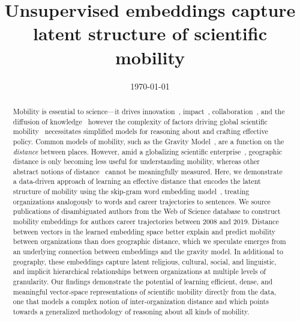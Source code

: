 \documentclass[12pt]{article} %
\begin{document}

\title{Unsupervised embeddings capture latent structure of scientific mobility} %
\date{\today}
\maketitle %

%
%

\begin{abstract}

Mobility is essential to science---it drives innovation~\autocite{braunerhjelm2020labor, kaiser2018innovation, armano2017innovation}, impact~\autocite{sugimoto2017mostimpact, petersen2018multiscale, jonkers2013return, franzoni2014advantage}, collaboration~\autocite{rodrigues2016mobility}, and the diffusion of knowledge~\autocite{braunerhjelm2020labor, azoulay2011diffusion, morgan2018prestige} however the complexity of factors driving global scientific mobility~\autocite{robinson2019mobility, vannoorden2012mobility, deville2014career, ackers2008mobility, scott2015dynamics} necessitates simplified models for reasoning about and crafting effective policy.
Common models of mobility, such as the Gravity Model~\autocite{curiel2018citygravity, lewer2008immigrationgravity, jung2008highwaygravity, hong2016busgravity, truscott2012epidemicgravity, xia2005measlesgravity, simini2012universal}, are a function on the \textit{distance} between places.
However, amid a globalizing scientific enterprise~\autocite{czaika2018globalisation}, geographic distance is only becoming less useful for understanding mobility, whereas other abstract notions of distance~\autocite{boschma2005proximity} cannot be meaningfully measured.
Here, we demonstrate a data-driven approach of learning an effective distance that encodes the latent structure of mobility using the skip-gram word embedding model~\autocite{mikolov2013word2vec}, treating organizations analogously to words and career trajectories to sentences.
We source publications of disambiguated authors from the Web of Science database to construct mobility embeddings for authors career trajectories between 2008 and 2019.
Distance between vectors in the learned embedding space better explain and predict mobility between organizations than does geographic distance, which we speculate emerges from an underlying connection between embeddings and the gravity model.
In additional to geography, these embeddings capture latent religious, cultural, social, and linguistic, and implicit hierarchical relationships between organizations at multiple levels of granularity.
Our findings demonstrate the potential of learning efficient, dense, and meaningful vector-space representations of scientific mobility directly from the data, one that models a complex notion of inter-organization distance and which points towards a generalized methodology of reasoning about all kinds of mobility.

\end{abstract}
\end{document}

